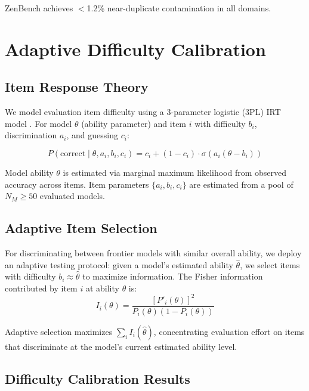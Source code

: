 \documentclass[11pt,a4paper]{article}
\begin{document}
ZenBench achieves $<$1.2\% near-duplicate contamination in all domains.

\section{Adaptive Difficulty Calibration}
\label{sec:calibration}

\subsection{Item Response Theory}

We model evaluation item difficulty using a 3-parameter logistic (3PL) IRT model
\cite{embretson2000item}. For model $\theta$ (ability parameter) and item $i$ with
difficulty $b_i$, discrimination $a_i$, and guessing $c_i$:

\begin{equation}
    P(\text{correct} \mid \theta, a_i, b_i, c_i) =
    c_i + (1 - c_i) \cdot \sigma(a_i(\theta - b_i))
    \label{eq:3pl}
\end{equation}

Model ability $\theta$ is estimated via marginal maximum likelihood from observed
accuracy across items. Item parameters $\{a_i, b_i, c_i\}$ are estimated from a pool
of $N_M \geq 50$ evaluated models.

\subsection{Adaptive Item Selection}

For discriminating between frontier models with similar overall ability, we deploy an
adaptive testing protocol: given a model's estimated ability $\hat\theta$, we select
items with difficulty $b_i \approx \hat\theta$ to maximize information. The Fisher
information contributed by item $i$ at ability $\theta$ is:
\begin{equation}
    I_i(\theta) = \frac{[P'_i(\theta)]^2}{P_i(\theta)(1 - P_i(\theta))}
    \label{eq:fisher_info}
\end{equation}

Adaptive selection maximizes $\sum_i I_i(\hat\theta)$, concentrating evaluation
effort on items that discriminate at the model's current estimated ability level.

\subsection{Difficulty Calibration Results}
\end{document}
